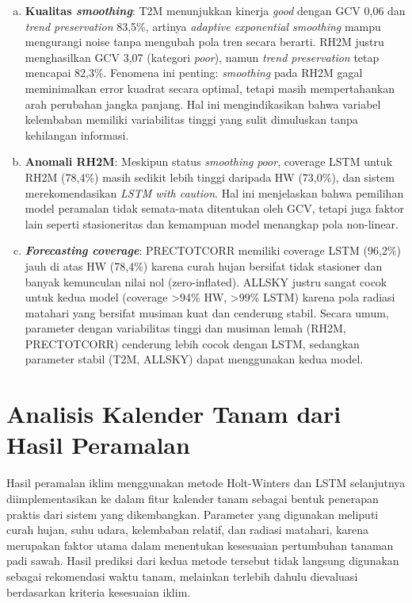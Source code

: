     \begin{enumerate}[(a)]
        \item \textbf{Kualitas \textit{smoothing}}:  
        T2M menunjukkan kinerja \textit{good} dengan GCV 0,06 dan \textit{trend preservation} 83,5\%, artinya \textit{adaptive exponential smoothing} mampu mengurangi noise tanpa mengubah pola tren secara berarti. RH2M justru menghasilkan GCV 3,07 (kategori \textit{poor}), namun \textit{trend preservation} tetap mencapai 82,3\%. Fenomena ini penting: \textit{smoothing} pada RH2M gagal meminimalkan error kuadrat secara optimal, tetapi masih mempertahankan arah perubahan jangka panjang. Hal ini mengindikasikan bahwa variabel kelembaban memiliki variabilitas tinggi yang sulit dimuluskan tanpa kehilangan informasi.  

        \item \textbf{Anomali RH2M}:  
        Meskipun status \textit{smoothing} \textit{poor}, coverage LSTM untuk RH2M (78,4\%) masih sedikit lebih tinggi daripada HW (73,0\%), dan sistem merekomendasikan \textit{LSTM with caution}. Hal ini menjelaskan bahwa pemilihan model peramalan tidak semata-mata ditentukan oleh GCV, tetapi juga faktor lain seperti stasioneritas dan kemampuan model menangkap pola non-linear.  

        \item \textbf{\textit{Forecasting coverage}}:  
        PRECTOTCORR memiliki coverage LSTM (96,2\%) jauh di atas HW (78,4\%) karena curah hujan bersifat tidak stasioner dan banyak kemunculan nilai nol (zero-inflated). ALLSKY justru sangat cocok untuk kedua model (coverage >94\% HW, >99\% LSTM) karena pola radiasi matahari yang bersifat musiman kuat dan cenderung stabil. Secara umum, parameter dengan variabilitas tinggi dan musiman lemah (RH2M, PRECTOTCORR) cenderung lebih cocok dengan LSTM, sedangkan parameter stabil (T2M, ALLSKY) dapat menggunakan kedua model.
    \end{enumerate}

\section{Analisis Kalender Tanam dari Hasil Peramalan}
Hasil peramalan iklim menggunakan metode Holt-Winters dan LSTM selanjutnya diimplementasikan ke dalam fitur kalender tanam sebagai bentuk penerapan praktis dari sistem yang dikembangkan. Parameter yang digunakan meliputi curah hujan, suhu udara, kelembaban relatif, dan radiasi matahari, karena merupakan faktor utama dalam menentukan kesesuaian pertumbuhan tanaman padi sawah. Hasil prediksi dari kedua metode tersebut tidak langsung digunakan sebagai rekomendasi waktu tanam, melainkan terlebih dahulu dievaluasi berdasarkan kriteria kesesuaian iklim.


